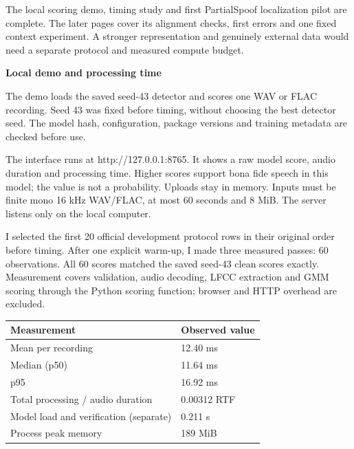 \documentclass[10pt,a4paper]{article}
\newcommand{\reporttitle}[1]{{\color{navy}\Large\bfseries #1}\par\vspace{5pt}}
\begin{document}
The local scoring demo, timing study and first PartialSpoof localization pilot are complete. The later pages cover its alignment checks, first errors and one fixed context experiment. A stronger representation and genuinely external data would need a separate protocol and measured compute budget.\par

\clearpage

\reporttitle{Local demo and processing time}

The demo loads the saved seed-43 detector and scores one WAV or FLAC recording. Seed 43 was fixed before timing, without choosing the best detector seed. The model hash, configuration, package versions and training metadata are checked before use.\par

\par

The interface runs at http://127.0.0.1:8765. It shows a raw model score, audio duration and processing time. Higher scores support bona fide speech in this model; the value is not a probability. Uploads stay in memory. Inputs must be finite mono 16 kHz WAV/FLAC, at most 60 seconds and 8 MiB. The server listens only on the local computer.\par

\par

I selected the first 20 official development protocol rows in their original order before timing. After one explicit warm-up, I made three measured passes: 60 observations. All 60 scores matched the saved seed-43 clean scores exactly. Measurement covers validation, audio decoding, LFCC extraction and GMM scoring through the Python scoring function; browser and HTTP overhead are excluded.\par

\begin{center}\small

\begin{tabular}{@{}ll@{}}\toprule

Measurement & Observed value \\

\midrule

Mean per recording & 12.40 ms \\

Median (p50) & 11.64 ms \\

p95 & 16.92 ms \\

Total processing / audio duration & 0.00312 RTF \\

Model load and verification (separate) & 0.211 s \\

Process peak memory & 189 MiB \\

\bottomrule\end{tabular}\end{center}
\end{document}

